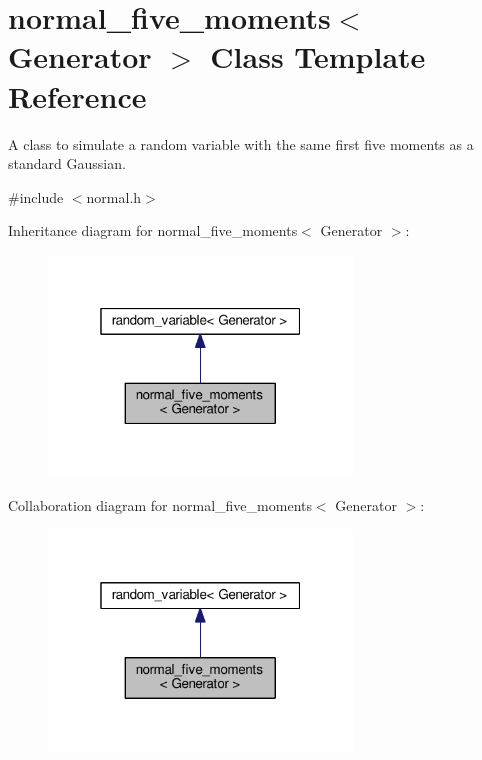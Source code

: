 \hypertarget{classnormal__five__moments}{}\section{normal\+\_\+five\+\_\+moments$<$ Generator $>$ Class Template Reference}
\label{classnormal__five__moments}


A class to simulate a random variable with the same first five moments as a standard Gaussian.  




{\ttfamily \#include $<$normal.\+h$>$}



Inheritance diagram for normal\+\_\+five\+\_\+moments$<$ Generator $>$\+:\nopagebreak
\begin{figure}[H]
\begin{center}
\leavevmode
\includegraphics[width=229pt]{classnormal__five__moments__inherit__graph}
\end{center}
\end{figure}


Collaboration diagram for normal\+\_\+five\+\_\+moments$<$ Generator $>$\+:\nopagebreak
\begin{figure}[H]
\begin{center}
\leavevmode
\includegraphics[width=229pt]{classnormal__five__moments__coll__graph}
\end{center}
\end{figure}
